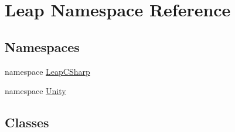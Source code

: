 \hypertarget{namespace_leap}{}\section{Leap Namespace Reference}
\label{namespace_leap}
\subsection*{Namespaces}
\begin{DoxyCompactItemize}
\item 
namespace \mbox{\hyperlink{namespace_leap_1_1_leap_c_sharp}{Leap\+C\+Sharp}}
\item 
namespace \mbox{\hyperlink{namespace_leap_1_1_unity}{Unity}}
\end{DoxyCompactItemize}
\subsection*{Classes}
